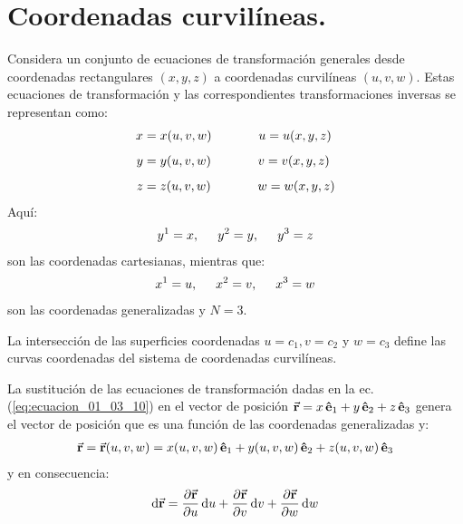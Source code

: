 \documentclass[hidelinks,12pt]{article}
\begin{document}
\section{Coordenadas curvilíneas.}

Considera un conjunto de ecuaciones de transformación generales desde coordenadas rectangulares $(x, y, z)$ a coordenadas curvilíneas $(u, v, w)$. Estas ecuaciones de transformación y las correspondientes transformaciones inversas se representan como:
\begin{align}
\begin{aligned}
x &= x(u, v, w) \hspace{1.3cm} u = u(x, y, z) \\[0.5em]
y &= y(u, v, w) \hspace{1.3cm} v = v(x, y, z) \\[0.5em]
z &= z(u, v, w) \hspace{1.3cm} w = w(x, y, z)
\end{aligned}
\label{eq:ecuacion_01_03_10}
\end{align}
Aquí: 
\begin{align*}
y^{1} = x, \hspace{0.5cm} y^{2} = y, \hspace{0.5cm} y^{3} = z
\end{align*}
son las coordenadas cartesianas, mientras que:
\begin{align*}
x^{1} = u, \hspace{0.5cm} x^{2} = v, \hspace{0.5cm} x^{3} = w
\end{align*}
son las coordenadas generalizadas y $N = 3$.
\par
La intersección de las superficies coordenadas $u = c_{1}, v = c_{2}$ y $w = c_{3}$ define las curvas coordenadas del sistema de coordenadas curvilíneas.
\par
La sustitución de las ecuaciones de transformación dadas en la ec. (\ref{eq:ecuacion_01_03_10}) en el vector de posición $\va{r} = x\, \vu{e}_{1} + y\, \vu{e}_{2} + z\, \vu{e}_{3}$ genera el vector de posición que es una función de las coordenadas generalizadas y:
\begin{align*}
\va{r} = \va{r} (u, v, w) = x (u, v, w) \, \vu{e}_{1} + y (u, v, w) \, \vu{e}_{2} + z (u, v, w) \, \vu{e}_{3}
\end{align*}
y en consecuencia:
\begin{align*}
\dd{\va{r}} = \pdv{\va{r}}{u} \dd{u} + \pdv{\va{r}}{v} \dd{v} + \pdv{\va{r}}{w} \dd{w}
\end{align*}
\end{document}
